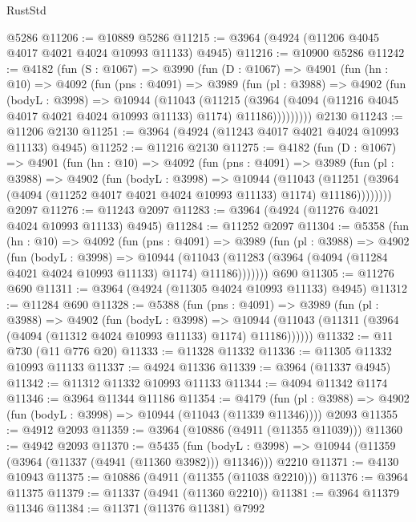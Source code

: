 \begin{lexlean}{RustStd}
\begin{coremodule}
{\begin{coremodule}
{{{{{{{{{{{{{{{{{{{{{{{{{{{{{{{{{{{{{{    @5286
@11206 := @10889 @5286
@11215 := @3964 (@4924 (@11206 @4045 @4017 @4021 @4024 @10993 @11133) @4945)
@11216 := @10900 @5286
@11242 := @4182
    (fun (S : @1067) =>
    @3990
      (fun (D : @1067) =>
      @4901
        (fun (hn : @10) =>
        @4092
          (fun (pns : @4091) =>
          @3989
            (fun (pl : @3988) =>
            @4902
              (fun (bodyL : @3998) =>
              @10944
                (@11043
                  (@11215
                    (@3964
                      (@4094 (@11216 @4045 @4017 @4021 @4024 @10993 @11133) @1174)
                      @11186)))))))))
    @2130
@11243 := @11206 @2130
@11251 := @3964 (@4924 (@11243 @4017 @4021 @4024 @10993 @11133) @4945)
@11252 := @11216 @2130
@11275 := @4182
    (fun (D : @1067) =>
    @4901
      (fun (hn : @10) =>
      @4092
        (fun (pns : @4091) =>
        @3989
          (fun (pl : @3988) =>
          @4902
            (fun (bodyL : @3998) =>
            @10944
              (@11043
                (@11251 (@3964 (@4094 (@11252 @4017 @4021 @4024 @10993 @11133) @1174) @11186))))))))
    @2097
@11276 := @11243 @2097
@11283 := @3964 (@4924 (@11276 @4021 @4024 @10993 @11133) @4945)
@11284 := @11252 @2097
@11304 := @5358
    (fun (hn : @10) =>
    @4092
      (fun (pns : @4091) =>
      @3989
        (fun (pl : @3988) =>
        @4902
          (fun (bodyL : @3998) =>
          @10944
            (@11043 (@11283 (@3964 (@4094 (@11284 @4021 @4024 @10993 @11133) @1174) @11186)))))))
    @690
@11305 := @11276 @690
@11311 := @3964 (@4924 (@11305 @4024 @10993 @11133) @4945)
@11312 := @11284 @690
@11328 := @5388
    (fun (pns : @4091) =>
    @3989
      (fun (pl : @3988) =>
      @4902
        (fun (bodyL : @3998) =>
        @10944 (@11043 (@11311 (@3964 (@4094 (@11312 @4024 @10993 @11133) @1174) @11186))))))
@11332 := @11 @730 (@11 @776 @20)
@11333 := @11328 @11332
@11336 := @11305 @11332 @10993 @11133
@11337 := @4924 @11336
@11339 := @3964 (@11337 @4945)
@11342 := @11312 @11332 @10993 @11133
@11344 := @4094 @11342 @1174
@11346 := @3964 @11344 @11186
@11354 := @4179
    (fun (pl : @3988) => @4902 (fun (bodyL : @3998) => @10944 (@11043 (@11339 @11346))))
    @2093
@11355 := @4912 @2093
@11359 := @3964 (@10886 (@4911 (@11355 @11039)))
@11360 := @4942 @2093
@11370 := @5435
    (fun (bodyL : @3998) => @10944 (@11359 (@3964 (@11337 (@4941 (@11360 @3982))) @11346)))
    @2210
@11371 := @4130 @10943
@11375 := @10886 (@4911 (@11355 (@11038 @2210)))
@11376 := @3964 @11375
@11379 := @11337 (@4941 (@11360 @2210))
@11381 := @3964 @11379 @11346
@11384 := @11371 (@11376 @11381) @7992
}}}}}}}}}}}}}}}}}}}}}}}}}}}}}}}}}}}}}}
\end{coremodule}}
\end{coremodule}
\end{lexlean}
